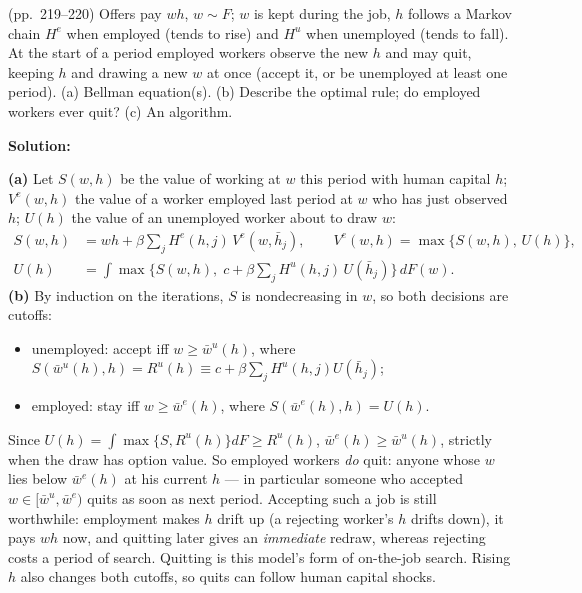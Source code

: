 \documentclass[12pt, letterpaper]{article}
\newcommand{\wb}{\bar w}
\begin{document}
\begin{tcolorbox}[evenbox,title={Exercise 6.24 \quad Human Capital}]
\begin{tcolorbox}[questionbox]
(pp.~219--220) Offers pay $wh$, $w\sim F$; $w$ is kept during the job, $h$ follows a Markov chain $H^e$ when employed
(tends to rise) and $H^u$ when unemployed (tends to fall). At the start of a period employed workers
observe the new $h$ and may quit, keeping $h$ and drawing a new $w$ at once (accept it, or be unemployed at
least one period). (a) Bellman equation(s). (b) Describe the optimal rule; do employed workers ever quit?
(c) An algorithm.
\end{tcolorbox}

\textbf{Solution:}

\textbf{(a)} Let $S(w,h)$ be the value of working at $w$ this period with human capital $h$; $V^e(w,h)$ the value
of a worker employed last period at $w$ who has just observed $h$; $U(h)$ the value of an unemployed worker
about to draw $w$:
\[
\boxed{\begin{aligned}
S(w,h)&=wh+\beta\textstyle\sum_jH^e(h,j)\,V^e(w,\bar h_j),\qquad V^e(w,h)=\max\{S(w,h),\,U(h)\},\\
U(h)&=\displaystyle\int\max\Big\{S(w,h),\;c+\beta\textstyle\sum_jH^u(h,j)\,U(\bar h_j)\Big\}\,dF(w).
\end{aligned}}
\]
\textbf{(b)} By induction on the iterations, $S$ is nondecreasing in $w$, so both decisions are cutoffs:
\begin{itemize}[itemsep=2pt]
\item unemployed: accept iff $w\ge\wb^u(h)$, where $S(\wb^u(h),h)=R^u(h)\equiv c+\beta\sum_jH^u(h,j)U(\bar h_j)$;
\item employed: stay iff $w\ge\wb^e(h)$, where $S(\wb^e(h),h)=U(h)$.
\end{itemize}
Since $U(h)=\int\max\{S,R^u(h)\}dF\ge R^u(h)$, $\boxed{\wb^e(h)\ge\wb^u(h)}$, strictly when the draw has option value.
So employed workers \emph{do} quit: anyone whose $w$ lies below $\wb^e(h)$ at his current $h$ --- in particular
someone who accepted $w\in[\wb^u,\wb^e)$ quits as soon as next period. Accepting such a job is still
worthwhile: employment makes $h$ drift up (a rejecting worker's $h$ drifts down), it pays $wh$ now, and
quitting later gives an \emph{immediate} redraw, whereas rejecting costs a period of search. Quitting is
this model's form of on-the-job search. Rising $h$ also changes both cutoffs, so quits can follow human
capital shocks.


\end{tcolorbox}
\end{document}
